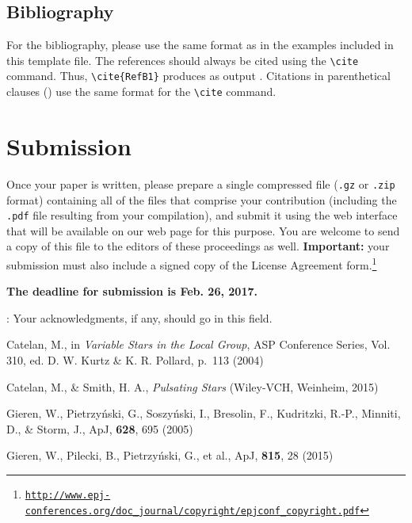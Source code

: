 \documentclass{webofc}
\begin{document}
\subsection{Bibliography}\label{sec:biblio}
For the bibliography, please use the same format as in the examples included in this template file. The references should always be cited using the \lstinline!\cite! command. Thus, \lstinline!\cite{RefB1}! produces as output \cite{RefB1}. Citations in parenthetical clauses (\cite{RefPRC1,RefJ1,RefJ2}) use the same format for the \lstinline!\cite! command. 


\section{Submission}\label{sec:summary}
Once your paper is written, please prepare a single compressed file (\lstinline!.gz! or \lstinline!.zip! format) containing all of the files that comprise your contribution (including the \lstinline!.pdf! file resulting from your compilation), and submit it using the web interface that will be available on our web page for this purpose. You are welcome to send a copy of this file to the editors of these proceedings as well. \textbf{Important:} your submission must also include a signed copy of the License Agreement form.\footnote{\tt\url{http://www.epj-conferences.org/doc_journal/copyright/epjconf_copyright.pdf}}

{\bf The deadline for submission is Feb. 26, 2017.} 



\begin{acknowledgement} 
\noindent\vskip 0.2cm
: Your acknowledgments, if any, should go in this field. 
\end{acknowledgement}

% 
%
%
\begin{thebibliography}{}
%
%

Catelan, M., in \textit{Variable Stars in the Local Group}, ASP Conference Series, Vol. 310, ed. D. W. Kurtz \& K. R. Pollard, p.~113 (2004)

Catelan, M., \& Smith, H. A., \textit{Pulsating Stars} (Wiley-VCH, Weinheim, 2015)

Gieren, W., Pietrzy{\'n}ski, G., Soszy{\'n}ski, I., Bresolin, F., Kudritzki, R.-P., Minniti, D., \& Storm, J., ApJ, \textbf{628}, 695 (2005)

Gieren, W., Pilecki, B., Pietrzy{\'n}ski, G., et al., ApJ, \textbf{815}, 28 (2015)

\end{thebibliography}
\end{document}
